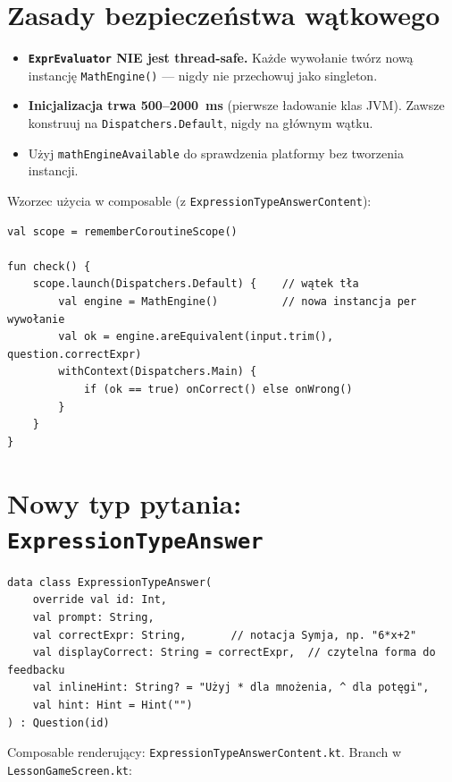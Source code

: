 \documentclass[11pt,a4paper]{article}
\begin{document}
\section{Zasady bezpieczeństwa wątkowego}

\begin{itemize}[leftmargin=*]
  \item \textbf{\texttt{ExprEvaluator} NIE jest thread-safe.}
        Każde wywołanie twórz nową instancję \texttt{MathEngine()} — nigdy nie
        przechowuj jako singleton.
  \item \textbf{Inicjalizacja trwa 500--2000~ms} (pierwsze ładowanie klas JVM).
        Zawsze konstruuj na \texttt{Dispatchers.Default}, nigdy na głównym wątku.
  \item Użyj \texttt{mathEngineAvailable} do sprawdzenia platformy bez tworzenia
        instancji.
\end{itemize}

Wzorzec użycia w composable (z \texttt{ExpressionTypeAnswerContent}):

\begin{lstlisting}
val scope = rememberCoroutineScope()

fun check() {
    scope.launch(Dispatchers.Default) {    // wątek tła
        val engine = MathEngine()          // nowa instancja per wywołanie
        val ok = engine.areEquivalent(input.trim(), question.correctExpr)
        withContext(Dispatchers.Main) {
            if (ok == true) onCorrect() else onWrong()
        }
    }
}
\end{lstlisting}

\section{Nowy typ pytania: \texttt{ExpressionTypeAnswer}}

\begin{lstlisting}
data class ExpressionTypeAnswer(
    override val id: Int,
    val prompt: String,
    val correctExpr: String,       // notacja Symja, np. "6*x+2"
    val displayCorrect: String = correctExpr,  // czytelna forma do feedbacku
    val inlineHint: String? = "Użyj * dla mnożenia, ^ dla potęgi",
    val hint: Hint = Hint("")
) : Question(id)
\end{lstlisting}

Composable renderujący: \texttt{ExpressionTypeAnswerContent.kt}.
Branch w \texttt{LessonGameScreen.kt}:
\end{document}
